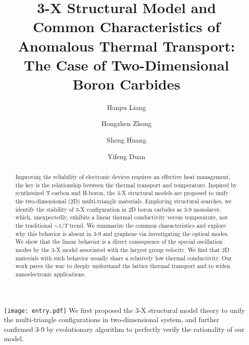 \documentclass[journal=jpclcd,manuscript=article, layout=twocolumn]{achemso}
\title{3-X Structural Model and Common Characteristics of Anomalous Thermal Transport: The Case of Two-Dimensional Boron Carbides}
\author{Hanpu Liang}
\author{Hongzhen Zhong}
\author{Sheng Huang}
\author{Yifeng Duan}
\affiliation{School of Materials and Physics, China University of Mining and Technology, Xuzhou, Jiangsu 221116, China}
\begin{document}
	
	

\begin{tocentry}
	\texttt{[image: entry.pdf]}
	We first proposed the 3-X structural model theory to unify the multi-triangle configurations in two-dimensional system, and further confirmed 3-9  by evolutionary algorithm to perfectly verify the rationality of our model.
\end{tocentry}


\begin{abstract}
Improving the reliability of electronic devices requires an effective heat management, the key is the relationship between the thermal transport and temperature. Inspired by synthesized T-carbon and H-boron, the 3-X structural models are proposed to unify the two-dimensional (2D) multi-triangle materials. Employing structural searches, we identify the stability of 3-X configuration in 2D boron carbides as 3-9  monolayer, which, unexpectedly, exhibits a linear thermal conductivity versus temperature, not the traditional $\sim1/T$ trend. We summarize the common characteristics and explore why this behavior is absent in 3-9  and graphene via investigating the optical modes. We show that the linear behavior is a direct consequence of the special oscillation modes by the 3-X model associated with the largest group velocity. We find that 2D materials with such behavior usually share a relatively low thermal conductivity. Our work paves the way to deeply understand the lattice thermal transport and to widen nanoelectronic applications. 
\end{abstract}
\end{document}
